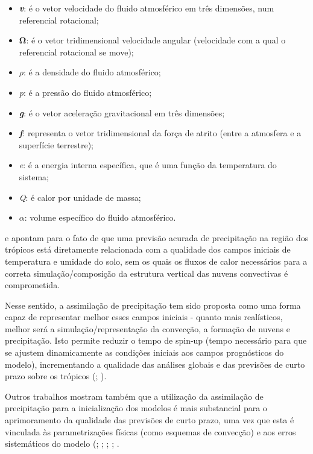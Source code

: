 \begin{itemize}
\item \textbf{\textit{v}}: é o vetor velocidade do fluido atmosférico em três dimensões, num referencial rotacional;
\item $\mathbf{\Omega}$: é o vetor tridimensional velocidade angular (velocidade com a qual o referencial rotacional se move);
\item $\rho$: é a densidade do fluido atmosférico;
\item \textit{p}: é a pressão do fluido atmosférico;
\item \textbf{\textit{g}}: é o vetor aceleração gravitacional em três dimensões;
\item \textbf{\textit{f}}: representa o vetor tridimensional da força de atrito (entre a atmosfera e a superfície terrestre);
\item \textit{e}: é a energia interna específica, que é uma função da temperatura do sistema;
\item \textit{Q}: é calor por unidade de massa;
\item $\alpha$: volume específico do fluido atmosférico. 
\end{itemize}

\cite{krishnamurty1991} e \cite{nunesroads2005} apontam para o fato de que uma previsão acurada de precipitação na região dos trópicos está diretamente relacionada com a qualidade dos campos iniciais de temperatura e umidade do solo, sem os quais os fluxos de calor necessários para a correta simulação/composição da estrutura vertical das nuvens convectivas é comprometida.

Nesse sentido, a assimilação de precipitação tem sido proposta como uma forma capaz de representar melhor esses campos iniciais - quanto mais realísticos, melhor será a simulação/representação da convecção, a formação de nuvens e precipitação. Isto permite reduzir o tempo de spin-up (tempo necessário para que se ajustem dinamicamente as condições iniciais aos campos prognósticos do modelo), incrementando a qualidade das análises globais e das previsões de curto prazo sobre os trópicos (\cite{heckley1990}; \cite{falkovich2000}).

Outros trabalhos mostram também que a utilização da assimilação de precipitação para a inicialização dos modelos é mais substancial para o aprimoramento da qualidade das previsões de curto prazo, uma vez que esta é vinculada às parametrizações físicas (como esquemas de convecção) e aos erros sistemáticos do modelo (\cite{kasahara1994}; \cite{mathur1995}; \cite{zupanskimesinger1995}; \cite{nunescocke2004}; \cite{messinger2005}.

